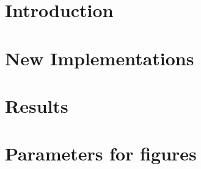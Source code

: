 \documentclass[oneside]{scrbook}			%
\begin{document}
\thispagestyle{empty} \clearpage										%
\pagestyle{plain}  %



\tableofcontents
\chapter{Introduction}




%
\chapter{New Implementations}





%
\chapter{Results}



\newpage

    

    
    

\newpage
\chapter*{Parameters for figures}

\newpage



 

%
\end{document}
